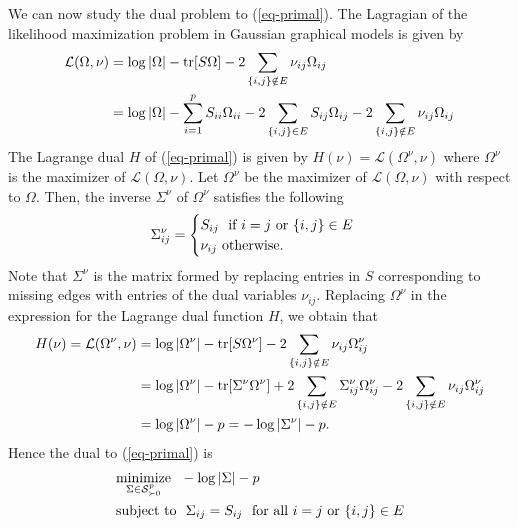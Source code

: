 We can now study the dual problem to (\ref{eq-primal}). The Lagragian of the likelihood maximization problem in Gaussian graphical models is given by
\begin{align*}
    \mathcal{L}(\Omega, \nu)
    &= \log |\Omega| - {\textrm{tr}}[S\Omega] - 2 \sum_{{\left\{i, j\right\}} \notin E} \nu_{ij}\Omega_{ij}\\
    &= \log |\Omega| - \sum_{i=1}^p S_{ii}\Omega_{ii} - 2 \sum_{{\left\{i,j\right\}} \in E} S_{ij}\Omega_{ij} - 2 \sum_{{\left\{i, j\right\}} \notin E} \nu_{ij}\Omega_{ij}
\end{align*}
The Lagrange dual $H$ of (\ref{eq-primal}) is given by $H(\nu) = \mathcal{L}(\Omega^\nu, \nu)$ where $\Omega^\nu$ is the maximizer of $\mathcal{L}(\Omega, \nu)$. Let $\Omega^\nu$ be the maximizer of $\mathcal{L}(\Omega, \nu)$ with respect to $\Omega$. Then, the inverse $\Sigma^\nu$ of $\Omega^\nu$ satisfies the following
\begin{equation*}
    \Sigma^\nu_{ij} = \begin{cases}
        S_{ij}\ {\textrm{ if }} i = j {\textrm{ or }} {\left\{i, j\right\}} \in E\\
        \nu_{ij}\ {\textrm{otherwise}}.
    \end{cases}
\end{equation*}
Note that $\Sigma^\nu$ is the matrix formed by replacing entries in $S$ corresponding to missing edges with entries of the dual variables $\nu_{ij}$. Replacing $\Omega^\nu$ in the expression for the Lagrange dual function $H$, we obtain that
\begin{align*}
    H(\nu) 
    = {\mathcal{L}}(\Omega^\nu, \nu)
    &= \log |\Omega^\nu| - {\textrm{tr}}[S\Omega^\nu] - 2 \sum_{{\left\{i, j\right\}} \notin E} \nu_{ij}\Omega^\nu_{ij}\\
    &= \log |\Omega^\nu| - {\textrm{tr}}[\Sigma^\nu\Omega^\nu] + 2 \sum_{{\left\{i, j\right\}} \notin E} \Sigma^\nu_{ij}\Omega^\nu_{ij} - 2 \sum_{{\left\{i, j\right\}} \notin E} \nu_{ij}\Omega^\nu_{ij}\\
    &= \log |\Omega^\nu| - p = -\log |\Sigma^\nu| - p.
\end{align*}
Hence the dual to (\ref{eq-primal}) is
\begin{align} \label{eq-dual}
    \begin{split}
        &\underset{\Sigma \in \S^p_{\succ 0}}{\t{minimize}}\ \  -\log |\Sigma| - p\\
        &\t{subject to}\ \ \Sigma_{ij} = S_{ij}\ \t{ for all } i = j \t{ or } \eset{i, j} \in E
    \end{split}
\end{align}
